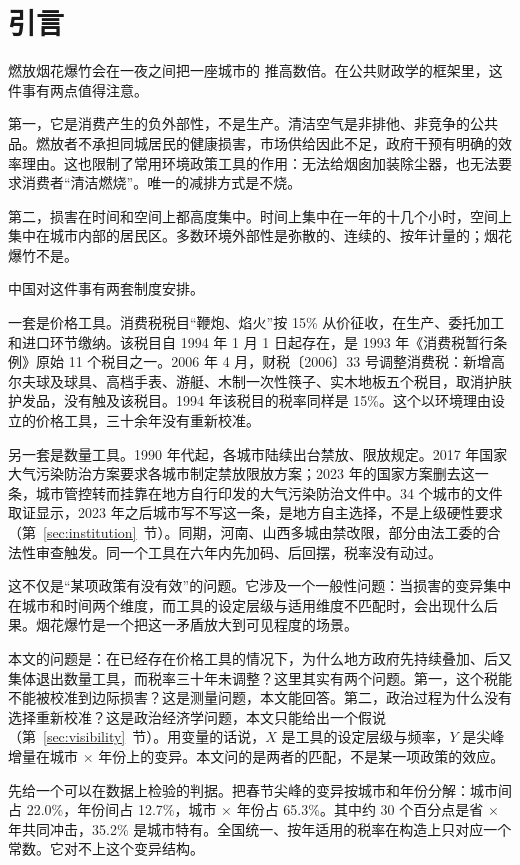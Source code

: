 \section{引言}

燃放烟花爆竹会在一夜之间把一座城市的  推高数倍。在公共财政学的框架里，这件事有两点值得注意。

第一，它是消费产生的负外部性，不是生产。清洁空气是非排他、非竞争的公共品。燃放者不承担同城居民的健康损害，市场供给因此不足，政府干预有明确的效率理由。这也限制了常用环境政策工具的作用：无法给烟囱加装除尘器，也无法要求消费者“清洁燃烧”。唯一的减排方式是不烧。

第二，损害在时间和空间上都高度集中。时间上集中在一年的十几个小时，空间上集中在城市内部的居民区。多数环境外部性是弥散的、连续的、按年计量的；烟花爆竹不是。

中国对这件事有两套制度安排。

一套是价格工具。消费税税目“鞭炮、焰火”按 15\% 从价征收，在生产、委托加工和进口环节缴纳。该税目自 1994 年 1 月 1 日起存在，是 1993 年《消费税暂行条例》原始 11 个税目之一。2006 年 4 月，财税〔2006〕33 号调整消费税：新增高尔夫球及球具、高档手表、游艇、木制一次性筷子、实木地板五个税目，取消护肤护发品，没有触及该税目。1994 年该税目的税率同样是 15\%。这个以环境理由设立的价格工具，三十余年没有重新校准。

另一套是数量工具。1990 年代起，各城市陆续出台禁放、限放规定。2017 年国家大气污染防治方案要求各城市制定禁放限放方案；2023 年的国家方案删去这一条，城市管控转而挂靠在地方自行印发的大气污染防治文件中。34 个城市的文件取证显示，2023 年之后城市写不写这一条，是地方自主选择，不是上级硬性要求（第~\ref{sec:institution}~节）。同期，河南、山西多城由禁改限，部分由法工委的合法性审查触发。同一个工具在六年内先加码、后回摆，税率没有动过。

这不仅是“某项政策有没有效”的问题。它涉及一个一般性问题：当损害的变异集中在城市和时间两个维度，而工具的设定层级与适用维度不匹配时，会出现什么后果。烟花爆竹是一个把这一矛盾放大到可见程度的场景。

本文的问题是：在已经存在价格工具的情况下，为什么地方政府先持续叠加、后又集体退出数量工具，而税率三十年未调整？这里其实有两个问题。第一，这个税能不能被校准到边际损害？这是测量问题，本文能回答。第二，政治过程为什么没有选择重新校准？这是政治经济学问题，本文只能给出一个假说（第~\ref{sec:visibility}~节）。用变量的话说，$X$ 是工具的设定层级与频率，$Y$ 是尖峰增量在城市 $\times$ 年份上的变异。本文问的是两者的匹配，不是某一项政策的效应。

先给一个可以在数据上检验的判据。把春节尖峰的变异按城市和年份分解：城市间占 22.0\%，年份间占 12.7\%，城市 $\times$ 年份占 65.3\%。其中约 30 个百分点是省 $\times$ 年共同冲击，35.2\% 是城市特有。全国统一、按年适用的税率在构造上只对应一个常数。它对不上这个变异结构。

